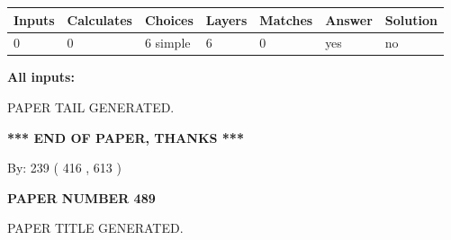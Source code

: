 \documentclass{ctexart}
\begin{document}
 
   
   
   
   
\noindent\begin{tabular}{|l|l|l|l|l|l|l|}
 \hline
Inputs & Calculates & Choices & Layers & Matches & Answer & Solution \\ \hline
 0  & 
 0  & 
 6
  simple  
  & 
 6  & 
 0  & 
  yes & 
  no 
  \\ \hline
 \end{tabular}
   
   
   
   
\noindent{}
   
   
   
   
\noindent\vspace{0.1in}\hspace{-0.08in} {\textbf{\Large{All inputs: }}}
   
   
   
   
   
   
 \vspace{0.2in}
 
   
   
\vspace{2.0in} PAPER TAIL GENERATED.
   
   
   
   
\vspace{1.0in} 
{\textbf{\large{ *** END OF PAPER, THANKS *** }}} 
   
   
\hspace{1.0in} By: 
 239 ( 416 ,  613 )
   
   
   
   
\newpage 
\setcounter{page}{ 
   489001 } 
   
   
   
   
 {\textbf{ \Large{ PAPER NUMBER  489  }}}
   
   
\vspace{0.2in}
   
   
   
   
   
   
   
   
 \vspace{0.2in}
 
 
 
 
   
   
 PAPER TITLE GENERATED.
   
\end{document}
